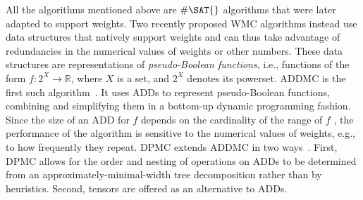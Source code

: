 \documentclass[letterpaper]{article} %
\theoremstyle{definition}
\theoremstyle{remark}
\begin{document}
All the algorithms mentioned above are $\#\SAT{}$ algorithms that were later
adapted to support weights. Two recently proposed \textsf{WMC} algorithms
instead use data structures that natively support weights and can thus take
advantage of redundancies in the numerical values of weights or other numbers.
These data structures are representations of \emph{pseudo-Boolean functions},
i.e., functions of the form $f\colon 2^X \to \mathbb{R}$, where $X$ is a set,
and $2^X$ denotes its powerset. \textsc{ADDMC} is the first such
algorithm~\cite{DBLP:conf/aaai/DudekPV20}. It uses ADDs to represent
pseudo-Boolean functions, combining and simplifying them in a bottom-up dynamic
programming fashion. Since the size of an ADD for $f$ depends on the cardinality
of the range of $f$ \cite{DBLP:journals/fmsd/BaharFGHMPS97}, the performance of
the algorithm is sensitive to the numerical values of weights, e.g., to how
frequently they repeat. \textsc{DPMC} extends \textsc{ADDMC} in two
ways~\cite{DBLP:conf/cp/DudekPV20}. First, \textsc{DPMC} allows for the order
and nesting of operations on ADDs to be determined from an
approximately-minimal-width tree decomposition rather than by heuristics.
Second, tensors are offered as an alternative to ADDs.

\end{document}
